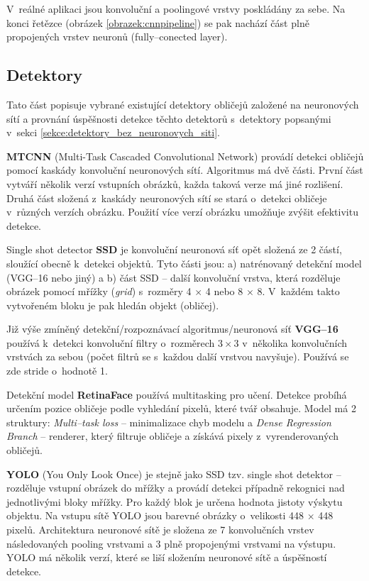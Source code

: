 V~reálné aplikaci jsou konvoluční a poolingové vrstvy poskládány za sebe. Na konci řetězce (obrázek \ref{obrazek:cnnpipeline}) se pak nachází část plně propojených vrstev neuronů (fully--conected layer).

\subsection*{Detektory}
Tato část popisuje vybrané existující detektory obličejů založené na neuronových sítí a provnání úspěšnosti detekce těchto detektorů s~detektory popsanými v~sekci \ref{sekce:detektory_bez_neuronovych_siti}.

\textbf{MTCNN} (Multi-Task Cascaded Convolutional Network) \cite{fdCNNComparison, MTCNN} provádí detekci obličejů pomocí kaskády konvoluční neuronových sítí. Algoritmus má dvě části. První část vytváří několik verzí vstupních obrázků, každa taková verze má jiné rozlišení. Druhá část složená z~kaskády neuronových sítí se stará o~detekci obličeje v~různých verzích obrázku. Použití více verzí obrázku umožňuje zvýšit efektivitu detekce.

Single shot detector \textbf{SSD} \cite{ssd} je konvoluční neuronová síť opět složená ze 2 částí, sloužící obecně k~detekci objektů. Tyto části jsou: a) natrénovaný detekční model (VGG--16 nebo jiný) a b) část SSD -- další konvoluční vrstva, která rozděluje obrázek pomocí mřížky (\emph{grid}) s~rozměry 4 $\times$ 4 nebo 8 $\times$ 8. V~každém takto vytvořeném bloku je pak hledán objekt (obličej).

Již výše zmíněný detekční/rozpoznávací algoritmus/neuronová síť \textbf{VGG--16} \cite{vgg-16} používá k~detekci konvoluční filtry o~rozměrech $3 \times 3$ v~několika konvolučních vrstvách za sebou (počet filtrů se s~každou další vrstvou navyšuje). Používá se zde stride o~hodnotě 1.

Detekční model \textbf{RetinaFace} \cite{lowLightFdReview} používá multitasking pro učení. Detekce probíhá určením pozice obličeje podle vyhledání pixelů, které tvář obsahuje. Model má 2 struktury: \emph{Multi--task loss} -- minimalizace chyb modelu a \emph{Dense Regression Branch} -- renderer, který filtruje obličeje a získává pixely z~vyrenderovaných obličejů.

\textbf{YOLO} (You Only Look Once) \cite{yolo} je stejně jako SSD tzv. single shot detektor -- rozděluje vstupní obrázek do mřížky a provádí detekci případně rekognici nad jednotlivými bloky mřížky. Pro každý blok je určena hodnota jistoty výskytu objektu. Na vstupu sítě YOLO jsou barevné obrázky o~velikosti 448 $\times$ 448 pixelů. Architektura neuronové sítě je složena ze 7 konvolučních vrstev následovaných pooling vrstvami a 3 plně propojenými vrstvami na výstupu.
YOLO má několik verzí, které se liší složením neuronové sítě a úspěšností detekce.


